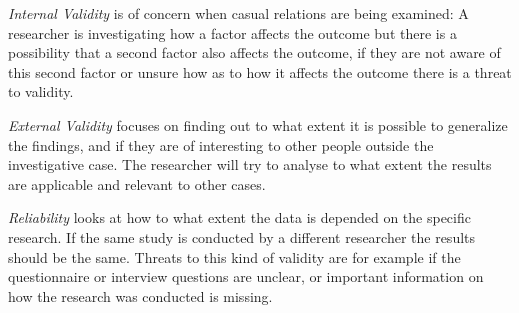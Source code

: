 \textit{Internal Validity} is of concern when casual relations are being examined: A researcher is investigating how a factor affects the outcome but there is a possibility that a second factor also affects the outcome, if they are not aware of this second factor or unsure how as to how it affects the outcome there is a threat to validity.

\textit{External Validity} focuses on finding out to what extent it is possible to generalize the findings, and if they are of interesting to other people outside the investigative case. The researcher will try to analyse to what extent the results are applicable and relevant to other cases.

\textit{Reliability} looks at how to what extent the data is depended on the specific research. If the same study is conducted by a different researcher the results should be the same. Threats to this kind of validity are for example if the questionnaire or interview questions are unclear, or important information on how the research was conducted is missing.


